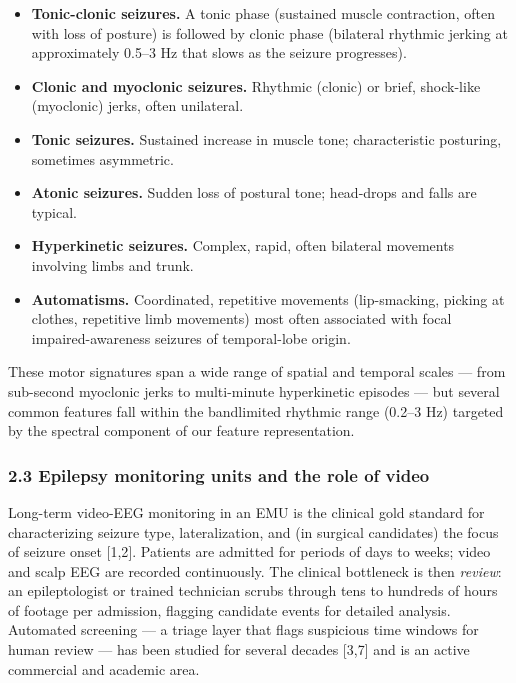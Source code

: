 \documentclass[
  11pt,
]{article}
\providecommand{\tightlist}{%
  \setlength{\itemsep}{0pt}\setlength{\parskip}{0pt}}
\begin{document}
\begin{itemize}
\tightlist
\item
  \textbf{Tonic-clonic seizures.} A tonic phase (sustained muscle
  contraction, often with loss of posture) is followed by clonic phase
  (bilateral rhythmic jerking at approximately 0.5--3 Hz that slows as
  the seizure progresses).
\item
  \textbf{Clonic and myoclonic seizures.} Rhythmic (clonic) or brief,
  shock-like (myoclonic) jerks, often unilateral.
\item
  \textbf{Tonic seizures.} Sustained increase in muscle tone;
  characteristic posturing, sometimes asymmetric.
\item
  \textbf{Atonic seizures.} Sudden loss of postural tone; head-drops and
  falls are typical.
\item
  \textbf{Hyperkinetic seizures.} Complex, rapid, often bilateral
  movements involving limbs and trunk.
\item
  \textbf{Automatisms.} Coordinated, repetitive movements (lip-smacking,
  picking at clothes, repetitive limb movements) most often associated
  with focal impaired-awareness seizures of temporal-lobe origin.
\end{itemize}

These motor signatures span a wide range of spatial and temporal scales
--- from sub-second myoclonic jerks to multi-minute hyperkinetic
episodes --- but several common features fall within the bandlimited
rhythmic range (0.2--3 Hz) targeted by the spectral component of our
feature representation.

\subsubsection{2.3 Epilepsy monitoring units and the role of
video}\label{epilepsy-monitoring-units-and-the-role-of-video}

Long-term video-EEG monitoring in an EMU is the clinical gold standard
for characterizing seizure type, lateralization, and (in surgical
candidates) the focus of seizure onset {[}1,2{]}. Patients are admitted
for periods of days to weeks; video and scalp EEG are recorded
continuously. The clinical bottleneck is then \emph{review}: an
epileptologist or trained technician scrubs through tens to hundreds of
hours of footage per admission, flagging candidate events for detailed
analysis. Automated screening --- a triage layer that flags suspicious
time windows for human review --- has been studied for several decades
{[}3,7{]} and is an active commercial and academic area.
\end{document}
